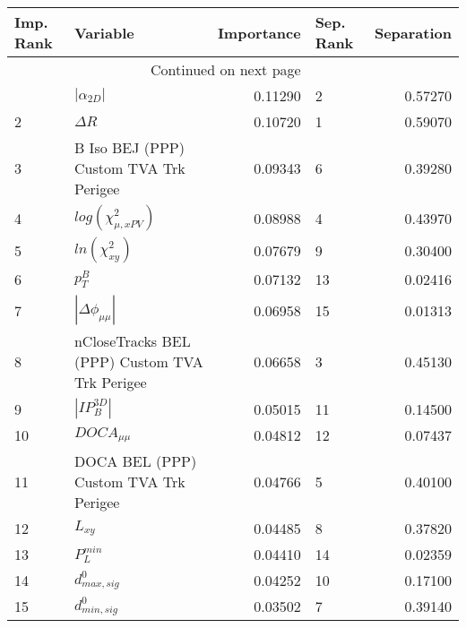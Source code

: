 \usepackage{lscape}

\begin{landscape}
\begin{longtable}{llrlr}
\toprule
Imp. Rank &                                       Variable &  Importance & Sep. Rank &  Separation \\
\midrule
\endhead
\midrule
\multicolumn{3}{r}{{Continued on next page}} \\
\midrule
\endfoot

\bottomrule
\endlastfoot
        1 &                                $|\alpha_{2D}|$ &     0.11290 &         2 &     0.57270 \\
        2 &                                     $\Delta R$ &     0.10720 &         1 &     0.59070 \\
        3 &         B Iso BEJ (PPP) Custom TVA Trk Perigee &     0.09343 &         6 &     0.39280 \\
        4 &                      $log(\chi^{2}_{\mu,xPV})$ &     0.08988 &         4 &     0.43970 \\
        5 &                            $ln(\chi^{2}_{xy})$ &     0.07679 &         9 &     0.30400 \\
        6 &                                      $p^B_{T}$ &     0.07132 &        13 &     0.02416 \\
        7 &                       $|\Delta \phi_{\mu\mu}|$ &     0.06958 &        15 &     0.01313 \\
        8 &  nCloseTracks BEL (PPP) Custom TVA Trk Perigee &     0.06658 &         3 &     0.45130 \\
        9 &                                $|IP_{B}^{3D}|$ &     0.05015 &        11 &     0.14500 \\
       10 &                                $DOCA_{\mu\mu}$ &     0.04812 &        12 &     0.07437 \\
       11 &          DOCA BEL (PPP) Custom TVA Trk Perigee &     0.04766 &         5 &     0.40100 \\
       12 &                                       $L_{xy}$ &     0.04485 &         8 &     0.37820 \\
       13 &                                  $P^{min}_{L}$ &     0.04410 &        14 &     0.02359 \\
       14 &                               $d^0_{max, sig}$ &     0.04252 &        10 &     0.17100 \\
       15 &                               $d^0_{min, sig}$ &     0.03502 &         7 &     0.39140 \\
\end{longtable}

\end{landscape}
